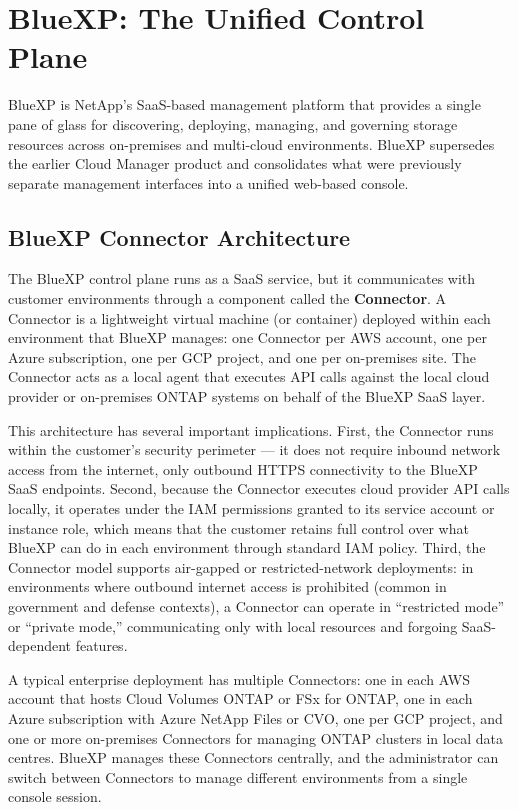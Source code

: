 \section{BlueXP: The Unified Control Plane}

BlueXP is NetApp's SaaS-based management platform that provides a single pane
of glass for discovering, deploying, managing, and governing storage resources
across on-premises and multi-cloud environments. BlueXP supersedes the earlier
Cloud Manager product and consolidates what were previously separate management
interfaces into a unified web-based console.

\subsection{BlueXP Connector Architecture}

The BlueXP control plane runs as a SaaS service, but it communicates with
customer environments through a component called the \textbf{Connector}. A
Connector is a lightweight virtual machine (or container) deployed within each
environment that BlueXP manages: one Connector per AWS account, one per Azure
subscription, one per GCP project, and one per on-premises site. The Connector
acts as a local agent that executes API calls against the local cloud provider
or on-premises ONTAP systems on behalf of the BlueXP SaaS layer.

This architecture has several important implications. First, the Connector
runs within the customer's security perimeter --- it does not require inbound
network access from the internet, only outbound HTTPS connectivity to the
BlueXP SaaS endpoints. Second, because the Connector executes cloud provider
API calls locally, it operates under the IAM permissions granted to its
service account or instance role, which means that the customer retains full
control over what BlueXP can do in each environment through standard IAM
policy. Third, the Connector model supports air-gapped or restricted-network
deployments: in environments where outbound internet access is prohibited
(common in government and defense contexts), a Connector can operate in
``restricted mode'' or ``private mode,'' communicating only with local
resources and forgoing SaaS-dependent features.

A typical enterprise deployment has multiple Connectors: one in each AWS
account that hosts Cloud Volumes ONTAP or FSx for ONTAP, one in each Azure
subscription with Azure NetApp Files or CVO, one per GCP project, and one or
more on-premises Connectors for managing ONTAP clusters in local data centres.
BlueXP manages these Connectors centrally, and the administrator can switch
between Connectors to manage different environments from a single console
session.

